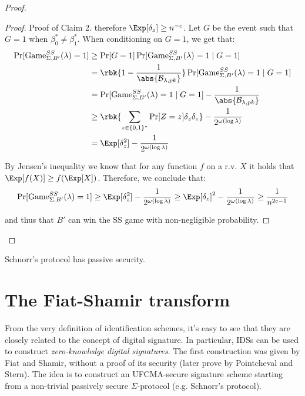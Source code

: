 \documentclass[a4paper, 12pt]{report}
\begin{document}
\begin{proof}
\begin{proof}{Proof of Claim 2.}
            therefore $\Exp[\delta_z] \geq n^{-c}$. Let $G$ be the event such that $G = 1$ when $\beta_0^* \neq \beta_1^*$. When conditioning on $G = 1$, we get that:
            \[\begin{split}
                \Pr[\mathrm{Game}_{\Sigma, B'}^{SS}(\lambda) = 1] &\geq \Pr[G = 1] \Pr[\mathrm{Game}_{\Sigma, B'}^{SS}(\lambda) = 1 \mid G = 1] \\
                &= \rbk{1- \frac{1}{\abs{\mathcal{B}_{\lambda, pk}}}} \Pr[\mathrm{Game}_{\Sigma, B'}^{SS}(\lambda) = 1 \mid G = 1] \\
                &= \Pr[\mathrm{Game}_{\Sigma, B'}^{SS}(\lambda) = 1 \mid G = 1] - \frac{1}{\abs{\mathcal{B}_{\lambda, pk}}} \\
                &\geq \rbk{\sum_{z \in \{0,1\}^*} \Pr[Z = z] \delta_z \delta_z} - \frac{1}{2^{\omega(\log \lambda)}} \\
                &= \Exp[\delta_z^2] - \frac{1}{2^{\omega(\log \lambda)}} \\
            \end{split}\]

            By Jensen's inequality we know that for any function $f$ on a r.v. $X$ it holds that $\Exp[f(X)] \geq f(\Exp[X])$. Therefore, we conclude that:
            \[\Pr[\mathrm{Game}_{\Sigma, B'}^{SS}(\lambda) = 1] \geq \Exp[\delta_z^2] - \frac{1}{2^{\omega(\log \lambda)}} \geq \Exp[\delta_z]^2 - \frac{1}{2^{\omega(\log \lambda)}} \geq \frac{1}{n^{2c-1}}\]
            
            and thus that $B'$ can win the SS game with non-negligible probability.
        \end{proof}
    \end{proof}

    \begin{framedcor}{}
        Schnorr's protocol has passive security.
    \end{framedcor}

    \section{The Fiat-Shamir transform}

    From the very definition of identification schemes, it's easy to see that they are closely related to the concept of digital signature. In particular, IDSs can be used to construct \textit{zero-knowledge digital signatures}. The first construction was given by Fiat and Shamir, without a proof of its security (later prove by Pointcheval and Stern). The idea is to construct an UFCMA-secure signature scheme starting from a non-trivial passively secure $\Sigma$-protocol (e.g. Schnorr's protocol).
\end{document}
